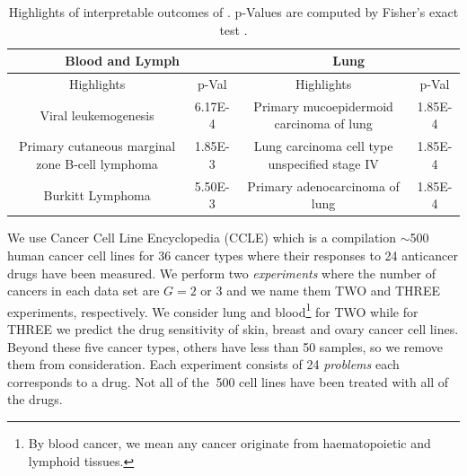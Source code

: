 %
\begin{table}[bp]
	\centering
	{\small
		\begin{tabular}{ |c|c|c|c|  }
			\hline 	
			\multicolumn{2}{|c|}{Blood and Lymph} & \multicolumn{2}{c|}{Lung}\\
			\hline
			Highlights &    p-Val  & Highlights &    p-Val   \\
			\hline
			Viral leukemogenesis		 & 6.17E-4  & Primary mucoepidermoid carcinoma of lung & 1.85E-4  \\
			Primary cutaneous marginal zone B-cell lymphoma	 & 1.85E-3   & Lung carcinoma cell type unspecified stage IV	& 1.85E-4   \\
			Burkitt Lymphoma	 & 5.50E-3  & Primary adenocarcinoma of lung  & 1.85E-4 \\
			\hline
		\end{tabular}
		\caption{Highlights of interpretable outcomes of \dc{}. p-Values are computed by  Fisher's exact test \cite{chen09toppgene}.}
		\label{table:1}}
\end{table}
We use Cancer Cell Line Encyclopedia (CCLE) \cite{barretina2012cancer} which is a compilation $\sim$500 human cancer cell lines for 36 cancer types where their responses to 24 anticancer drugs have been measured.%
We perform two \emph{experiments} where the number of cancers in each data set are $G =2$ or $3$ and we name them TWO and THREE experiments, respectively. 
We consider lung and blood\footnote{By blood cancer, we mean any cancer originate from haematopoietic and lymphoid tissues.} 
for TWO while for THREE we predict the drug sensitivity of skin, breast and ovary cancer cell lines. 
Beyond these five cancer types, others have less than 50 samples, so we remove them from consideration.
Each experiment consists of 24 \emph{problems} each corresponds to a drug. %
Not all of the $~$500 cell lines have been treated with all of the drugs. 
